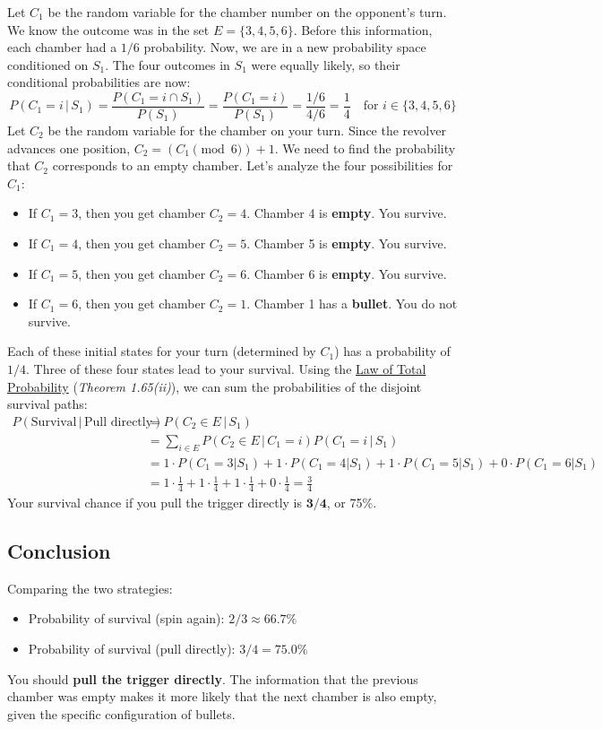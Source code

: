 \documentclass[11pt,a4paper]{article}
\theoremstyle{tutorstyle}
\newcommand{\concept}[2]{\hyperlink{#1}{#2}}
\begin{document}
Let $C_1$ be the random variable for the chamber number on the opponent's turn. We know the outcome was in the set $E=\{3, 4, 5, 6\}$. Before this information, each chamber had a $1/6$ probability. Now, we are in a new probability space conditioned on $S_1$. The four outcomes in $S_1$ were equally likely, so their conditional probabilities are now:
\[
P(C_1=i \,|\, S_1) = \frac{P(C_1=i \cap S_1)}{P(S_1)} = \frac{P(C_1=i)}{P(S_1)} = \frac{1/6}{4/6} = \frac{1}{4} \quad \text{for } i \in \{3,4,5,6\}
\]
Let $C_2$ be the random variable for the chamber on your turn. Since the revolver advances one position, $C_2 = (C_1 \pmod 6) + 1$. We need to find the probability that $C_2$ corresponds to an empty chamber. Let's analyze the four possibilities for $C_1$:
\begin{itemize}[leftmargin=*]
    \item If $C_1 = 3$, then you get chamber $C_2 = 4$. Chamber 4 is \textbf{empty}. You survive.
    \item If $C_1 = 4$, then you get chamber $C_2 = 5$. Chamber 5 is \textbf{empty}. You survive.
    \item If $C_1 = 5$, then you get chamber $C_2 = 6$. Chamber 6 is \textbf{empty}. You survive.
    \item If $C_1 = 6$, then you get chamber $C_2 = 1$. Chamber 1 has a \textbf{bullet}. You do not survive.
\end{itemize}
Each of these initial states for your turn (determined by $C_1$) has a probability of $1/4$. Three of these four states lead to your survival. Using the \concept{concept_totalprob}{Law of Total Probability} (\textit{Theorem 1.65(ii)}), we can sum the probabilities of the disjoint survival paths:
\begin{align*}
P(\text{Survival} \,|\, \text{Pull directly}) &= P(C_2 \in E \,|\, S_1) \\
&= \sum_{i \in E} P(C_2 \in E \,|\, C_1=i) P(C_1=i \,|\, S_1) \\
&= 1 \cdot P(C_1=3|S_1) + 1 \cdot P(C_1=4|S_1) + 1 \cdot P(C_1=5|S_1) + 0 \cdot P(C_1=6|S_1) \\
&= 1 \cdot \frac{1}{4} + 1 \cdot \frac{1}{4} + 1 \cdot \frac{1}{4} + 0 \cdot \frac{1}{4} = \frac{3}{4}
\end{align*}
Your survival chance if you pull the trigger directly is $\mathbf{3/4}$, or 75\%.

\subsection{Conclusion}
Comparing the two strategies:
\begin{itemize}
    \item Probability of survival (spin again): $2/3 \approx 66.7\%$
    \item Probability of survival (pull directly): $3/4 = 75.0\%$
\end{itemize}
You should \textbf{pull the trigger directly}. The information that the previous chamber was empty makes it more likely that the next chamber is also empty, given the specific configuration of bullets.
\end{document}
